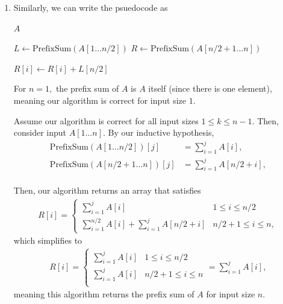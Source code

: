 \documentclass[12pt]{article}
\begin{document}
\begin{enumerate}
    The recurrence of this algorithm satisfies $T(n) = 2T(n/2) +
    \mathcal O(1),$ and $T(1) = \mathcal O(1),$ meaning by the master
    theorem we have a time complexity of $\mathcal O(n).$

    \newpage

  \item Similarly, we can write the psuedocode as
    \begin{algorithm}
      \caption{D\&C Prefix Sum}
      \begin{algorithmic}
        \State \Return $A$
        \EndIf

        \vspace{5mm}

        \State $L \gets \text{PrefixSum}(A[1 \ldots n/2])$
        \State $R \gets \text{PrefixSum}(A[n/2 + 1 \ldots n])$

        \State $R[i] \gets R[i] + L[n/2]$
        \EndFor
        \EndProcedure
      \end{algorithmic}
    \end{algorithm}

    For $n = 1,$ the prefix sum of $A$ is $A$ itself (since there is
    one element), meaning our algorithm is correct for input size $1.$

    Assume our algorithm is correct for all input sizes $1 \leq k
    \leq n - 1.$ Then, consider input $A[1 \ldots n].$ By our
    inductive hypothesis,
    \begin{align*}
      \text{PrefixSum}(A[1 \ldots n/2])[j] &= \sum_{i = 1}^{j} A[i], \\
      \text{PrefixSum}(A[n/2 + 1 \ldots n])[j] &= \sum_{i = 1}^{j}
      A[n/2 + i], \\
    \end{align*}

    Then, our algorithm returns an array that satisfies
    \begin{align*}
      R[i] =
      \begin{cases}
        \sum_{i = 1}^{j} A[i] & 1 \leq i \leq n/2 \\
        \sum_{i =1}^{n/2} A[i] + \sum_{i = 1}^{j} A[n/2 + i] & n/2 +
        1 \leq i \leq n,
      \end{cases}
    \end{align*}
    which simplifies to
    \begin{align*}
      R[i] =
      \begin{cases}
        \sum_{i = 1}^{j} A[i] & 1 \leq i \leq n/2 \\
        \sum_{i = 1}^{j} A[i] & n/2 + 1 \leq i \leq n \\
      \end{cases}         = \sum_{i = 1}^{j} A[i],
    \end{align*}
    meaning this algorithm returns the prefix sum of $A$ for input size $n.$


\end{enumerate}
\end{document}
